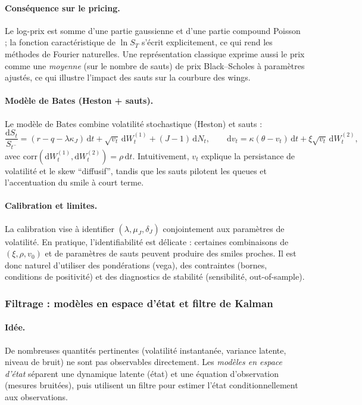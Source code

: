 \documentclass[11pt,a4paper]{article}
\newcommand{\dd}{\mathrm{d}}
\newcommand{\1}{\mathbf{1}}
\begin{document}
\paragraph{Cons\'equence sur le pricing.}
Le log-prix est somme d'une partie gaussienne et d'une partie compound Poisson ; la fonction caract\'eristique
de $\ln S_T$ s'\'ecrit explicitement, ce qui rend les m\'ethodes de Fourier naturelles. Une repr\'esentation classique
exprime aussi le prix comme une \emph{moyenne} (sur le nombre de sauts) de prix Black--Scholes \`a param\`etres ajust\'es,
ce qui illustre l'impact des sauts sur la courbure des wings.

\paragraph{Mod\`ele de Bates (Heston + sauts).}
Le mod\`ele de Bates combine volatilité stochastique (Heston) et sauts :
\[
\frac{\dd S_t}{S_{t^-}}
= (r-q-\lambda\kappa_J)\,\dd t + \sqrt{v_t}\,\dd W_t^{(1)} + (J-1)\,\dd N_t,
\qquad
\dd v_t = \kappa(\theta-v_t)\,\dd t + \xi\sqrt{v_t}\,\dd W_t^{(2)},
\]
avec $\mathrm{corr}(\dd W_t^{(1)},\dd W_t^{(2)})=\rho\,\dd t$.
Intuitivement, $v_t$ explique la persistance de volatilité et le skew ``diffusif'', tandis que les sauts pilotent
les queues et l'accentuation du smile \`a court terme.

\paragraph{Calibration et limites.}
La calibration vise \`a identifier $(\lambda,\mu_J,\delta_J)$ conjointement aux param\`etres de volatilité.
En pratique, l'identifiabilit\'e est d\'elicate : certaines combinaisons de $(\xi,\rho,v_0)$ et de param\`etres de sauts
peuvent produire des smiles proches. Il est donc naturel d'utiliser des pond\'erations (vega), des contraintes
(bornes, conditions de positivité) et des diagnostics de stabilit\'e (sensibilit\'e, out-of-sample).

\subsubsection{Filtrage : mod\`eles en espace d'\'etat et filtre de Kalman}

\paragraph{Id\'ee.}
De nombreuses quantit\'es pertinentes (volatilité instantan\'ee, variance latente, niveau de bruit) ne sont pas observables
directement. Les \emph{mod\`eles en espace d'\'etat} s\'eparent une dynamique latente (\'etat) et une \'equation d'observation
(mesures bruit\'ees), puis utilisent un filtre pour estimer l'\'etat conditionnellement aux observations.
\end{document}
